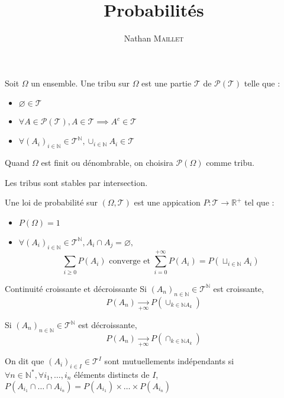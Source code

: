 \documentclass[french, a4paper, 10pt, twocolumn]{article}
\title{Probabilités}
\author{Nathan \textsc{Maillet}}
\date{}
\newcommand{\limit}[1]{\underset{#1}{\rightarrow}}  %
\newcommand{\N}{\mathbb{N}}   %
\newcommand{\R}{\mathbb{R}}   %
\begin{document}
\maketitle

\begin{definition}
    Soit \(\Omega\) un ensemble.
    Une tribu sur \(\Omega\) est une partie \(\mathcal{T}\) de \(\mathcal{P(T)}\) telle que :
        \begin{itemize}
            \item \(\varnothing \in \mathcal{T}\)
            \item \(\forall A \in \mathcal{P(T)}, A \in \mathcal{T} \implies A^c \in  \mathcal{T}\)
            \item \(\forall (A_i)_{i\in \N} \in \mathcal{T}^{\N}, \cup_{i\in \N}A_i \in \mathcal{T}\)
        \end{itemize}
    \tcblower
    Quand \(\Omega\) est finit ou dénombrable, on choisira \(\mathcal{P(\Omega)}\) comme tribu.

    Les tribus sont stables par intersection.
\end{definition}

\begin{definition}
    Une loi de probabilité sur $(\Omega,\mathcal{T})$ est une appication \(P : \mathcal{T} \rightarrow \R^+\) tel que :
    \begin{itemize}
        \item \(P(\Omega)=1\)
        \item \(\forall (A_i)_{i\in \N} \in \mathcal{T}^{\N}, A_i\cap A_j =\varnothing,\)
        \[\sum_{i\geq 0}^{}P(A_i) \text{ converge et } \sum_{i=0}^{+\infty}P(A_i)=P(\sqcup_{i\in \N}A_i)\] 
    \end{itemize}
\end{definition}

\begin{theoreme}{Continuité croissante et décroissante}
    Si \((A_n)_{n\in \N} \in \mathcal{T}^{\N}\) est croissante, \[P(A_n)\limit{+\infty}P(\cup_{k\in \N A_k})\]
    
    Si \((A_n)_{n\in \N} \in \mathcal{T}^{\N}\) est décroissante, \[P(A_n)\limit{+\infty}P(\cap_{k\in \N A_k})\]
\end{theoreme}

\begin{definition}
    On dit que \((A_i)_{i \in I} \in \mathcal{T}^I\) sont mutuellements indépendants si \(\forall n \in \N^*, \forall i_1,\dots,i_n\)
    éléments distincts de \(I\), \(P(A_{i_1}\cap\dots\cap A_{i_n})=P(A_{i_1})\times\dots\times P(A_{i_n})\)
\end{definition}
\end{document}
